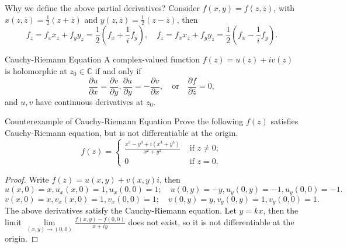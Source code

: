 \begin{note}
  Why we define the above partial derivatives?
  Consider $f(x,y) = f(z, \overline{z})$,
  with $x(z, \overline{z}) = \frac{1}{2}(z + \overline{z})$ and $y(z,
  \overline{z}) = \frac{1}{2}(z - \overline{z})$, then
  \begin{equation}
    f_z = f_x x_z + f_y y_z = \frac{1}{2}(f_x + \frac{1}{i}f_y), \quad
    f_{\overline{z}} = f_x x_{\overline{z}} + f_y y_{\overline{z}} = \frac{1}{2}(f_x - \frac{1}{i}f_y).
  \end{equation}
\end{note}

\begin{theorem}{Cauchy-Riemann Equation}{}
  A complex-valued function $f(z) = u(z) + iv(z)$ is holomorphic at $z_0 \in \mathbb{C}$ if and
  only if
  \begin{equation}
    \frac{\partial u}{\partial x} = \frac{\partial v}{\partial y},
    \frac{\partial u}{\partial y} = - \frac{\partial v}{\partial x}, \quad
    \text{or} \quad
    \frac{\partial f}{\partial \overline{z}} = 0,
  \end{equation}
  and $u, v$ have continuous derivatives at $z_0$.
\end{theorem}

\begin{example}{Counterexample of Cauchy-Riemann Equation}{}
  Prove the following $f(z)$ satisfies Cauchy-Riemann equation,
  but is not differentiable at the origin.
  \begin{equation}
    f(z) =
    \begin{cases}
      \frac{x^3 - y^3 + i(x^3 + y^3)}{x^2 + y^2} & \text{ if } z \neq 0;\\
      0 & \text{ if } z = 0.
    \end{cases}
  \end{equation}
\end{example}

\begin{proof}
  Write $f(z) = u(x,y) + v(x,y)i$, then
  \begin{equation}
    u(x, 0) = x, u_x(x, 0) = 1, u_x(0, 0) = 1; \quad
    u(0, y) = -y, u_y(0, y) = -1, u_y(0, 0) = -1.
  \end{equation}
  \begin{equation}
    v(x,0) = x, v_x(x,0) = 1, v_x(0,0) = 1; \quad
    v(0,y) = y, v_y(0, y) = 1, v_y(0, 0) = 1.
  \end{equation}
  The above derivatives satisfy the Cauchy-Riemann equation.
  Let $y = kx$, then the limit $\lim \limits _{(x,y) \rightarrow (0,0)}\frac{f(x,y) - f(0, 0)}{x+iy}$
  does not exist, so it is not differentiable at the origin.
\end{proof}

